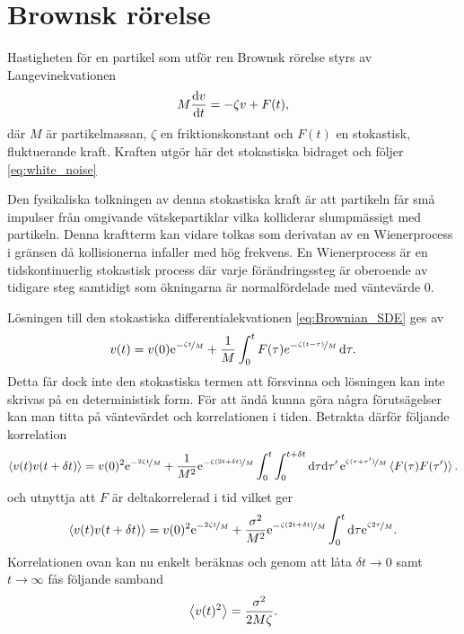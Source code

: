 \section{Brownsk rörelse}\label{sec:brown}
Hastigheten för en partikel som utför ren Brownsk rörelse styrs av
Langevinekvationen~\cite{Mazo_Brownian2002} 
\begin{equation} \label{eq:Brownian_SDE}
    M\dv{v}{t}=-\zeta v + F(t),
\end{equation}
där $M$ är partikelmassan, $\zeta$ en friktionskonstant och $F(t)$ en
stokastisk, fluktuerande kraft. Kraften utgör här det stokastiska
bidraget och följer \eqref{eq:white_noise}

Den fysikaliska tolkningen av denna stokastiska kraft är att partikeln
får små impulser från omgivande vätskepartiklar vilka kolliderar
slumpmässigt med partikeln.  
Denna kraftterm kan vidare tolkas som derivatan av en
Wienerprocess i gränsen då kollisionerna infaller med hög frekvens. En
Wienerprocess är en tidskontinuerlig stokastisk process där varje
förändringssteg är oberoende av tidigare steg samtidigt som
ökningarna är normalfördelade med
väntevärde 0.

Lösningen till den stokastiska differentialekvationen
\eqref{eq:Brownian_SDE} ges av  
\begin{equation}
v(t)
=v(0)\mathrm{e}^{-\nicefrac{\zeta t}{M}}
 +\frac{1}{M}\int^t_0 F(\tau)e^{-\nicefrac{\zeta (t-\tau)}{M}} \,\mathrm{d}\tau.
\end{equation}
Detta får dock inte den stokastiska termen att försvinna och lösningen kan inte skrivas på en deterministisk form. För att ändå kunna göra några förutsägelser kan man titta på väntevärdet och korrelationen i tiden. Betrakta därför följande korrelation 
\begin{equation}
\ev{v(t)v(t+\delta t)} 
= v(0)^2\ee^{-\nicefrac{2\zeta t}{M}}
+ \frac{1}{M^2}\ee^{-\nicefrac{\zeta (2t+\delta t)}{M}}
  \int_0^t\int_0^{t+\delta t}\dd\tau\dd\tau'\, 
    \ee^{\nicefrac{\zeta (\tau+\tau')}{M}}\ev{F(\tau)F(\tau')}.
\end{equation}
och utnyttja att $F$ är deltakorrelerad i tid vilket ger 
\begin{equation}
\ev{v(t)v(t+\delta t)} 
= v(0)^2\ee^{-\nicefrac{2\zeta t}{M}}
 +\frac{\sigma^2}{M^2}\ee^{-\nicefrac{\zeta (2t+\delta t)}{M}}
  \int_0^t\dd\tau\ee^{\nicefrac{\zeta 2\tau}{M}}.
\end{equation}
Korrelationen ovan kan nu enkelt beräknas och genom att låta $\delta t\to 0$ samt $t\to \infty$ fås följande samband
\begin{equation}
    \ev{v(t)^2} = \frac{\sigma^2}{2M\zeta}.
\end{equation}

